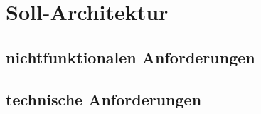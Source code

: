 \section{Soll-Architektur}
\subsection{nichtfunktionalen Anforderungen}


\subsection{technische Anforderungen}


